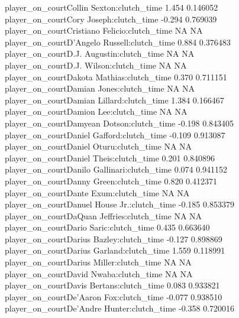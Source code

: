 \documentclass[
  landscape]{article}
\begin{document}
{player\_on\_courtCollin Sexton:clutch\_time 1.454 0.146052\\
player\_on\_courtCory Joseph:clutch\_time -0.294 0.769039\\
player\_on\_courtCristiano Felicio:clutch\_time NA NA\\
player\_on\_courtD'Angelo Russell:clutch\_time 0.884 0.376483\\
player\_on\_courtD.J. Augustin:clutch\_time NA NA\\
player\_on\_courtD.J. Wilson:clutch\_time NA NA\\
player\_on\_courtDakota Mathias:clutch\_time 0.370 0.711151\\
player\_on\_courtDamian Jones:clutch\_time NA NA\\
player\_on\_courtDamian Lillard:clutch\_time 1.384 0.166467\\
player\_on\_courtDamion Lee:clutch\_time NA NA\\
player\_on\_courtDamyean Dotson:clutch\_time -0.198 0.843405\\
player\_on\_courtDaniel Gafford:clutch\_time -0.109 0.913087\\
player\_on\_courtDaniel Oturu:clutch\_time NA NA\\
player\_on\_courtDaniel Theis:clutch\_time 0.201 0.840896\\
player\_on\_courtDanilo Gallinari:clutch\_time 0.074 0.941152\\
player\_on\_courtDanny Green:clutch\_time 0.820 0.412371\\
player\_on\_courtDante Exum:clutch\_time NA NA\\
player\_on\_courtDanuel House Jr.:clutch\_time -0.185 0.853379\\
player\_on\_courtDaQuan Jeffries:clutch\_time NA NA\\
player\_on\_courtDario Saric:clutch\_time 0.435 0.663640\\
player\_on\_courtDarius Bazley:clutch\_time -0.127 0.898869\\
player\_on\_courtDarius Garland:clutch\_time 1.559 0.118991\\
player\_on\_courtDarius Miller:clutch\_time NA NA\\
player\_on\_courtDavid Nwaba:clutch\_time NA NA\\
player\_on\_courtDavis Bertans:clutch\_time 0.083 0.933821\\
player\_on\_courtDe'Aaron Fox:clutch\_time -0.077 0.938510\\
player\_on\_courtDe'Andre Hunter:clutch\_time -0.358 0.720016\\
}
\end{document}
